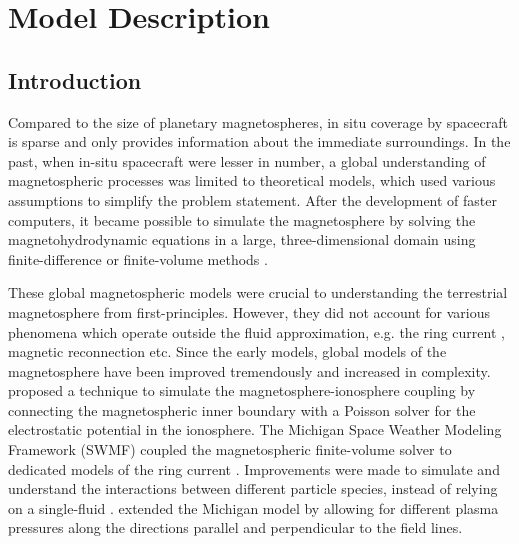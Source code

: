 
\chapter{Model Description}


\section{Introduction}

Compared to the size of planetary magnetospheres, in situ coverage by spacecraft is sparse and only provides information about the immediate surroundings. In the past, when in-situ spacecraft were lesser in number, a global understanding of magnetospheric processes was limited to theoretical models, which used various assumptions to simplify the problem statement. After the development of faster computers, it became possible to simulate the magnetosphere by solving the magnetohydrodynamic equations in a large, three-dimensional domain using finite-difference or finite-volume methods \cite{Leboeuf1978GlobalMagnetosphere,Walker1989GlobalMagnetosphere,Ashour-Abdalla1985SpaceSimulations}. 

These global magnetospheric models were crucial to understanding the terrestrial magnetosphere from first-principles. However, they did not account for various phenomena which operate outside the fluid approximation, e.g. the ring current \cite{Fok1999ModelingSubstorms}, magnetic reconnection \cite{Birn2001GeospaceChallenge} etc. Since the early models, global models of the magnetosphere have been improved tremendously and increased in complexity.  proposed a technique to simulate the magnetosphere-ionosphere coupling by connecting the magnetospheric inner boundary with a Poisson solver for the electrostatic potential in the ionosphere. The Michigan Space Weather Modeling Framework (SWMF) coupled the magnetospheric finite-volume solver to dedicated models of the ring current \cite{DeZeeuw2004CouplingResults}. Improvements were made to simulate and understand the interactions between different particle species, instead of relying on a single-fluid \cite{Glocer2009MultifluidResults,Wiltberger2010InfluenceMagnetosphere}.  extended the Michigan model by allowing for different plasma pressures along the directions parallel and perpendicular to the field lines. 

